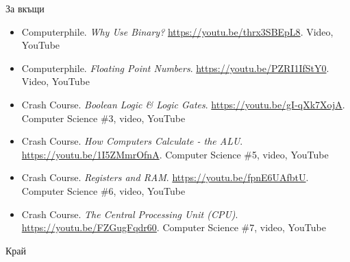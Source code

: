 \documentclass[14pt, aspectratio=169]{beamer}
\begin{document}
\begin{frame}{За вкъщи}
  \footnotesize
  \begin{itemize}[<1->]
    \item \textcolor{tuesnavy}{Computerphile}. \emph{Why Use Binary?}
      {\color{bibnote}\url{https://youtu.be/thrx3SBEpL8}. Video, YouTube}
    \item \textcolor{tuesnavy}{Computerphile}. \emph{Floating Point Numbers}.
      {\color{bibnote}\url{https://youtu.be/PZRI1IfStY0}. Video, YouTube}
    \item \textcolor{tuesnavy}{Crash Course}. \emph{Boolean Logic \& Logic Gates}.
      {\color{bibnote}\url{https://youtu.be/gI-qXk7XojA}. Computer Science
        \#3, video, YouTube}
    \item \textcolor{tuesnavy}{Crash Course}. \emph{How Computers Calculate -
      the ALU}. {\color{bibnote}\url{https://youtu.be/1I5ZMmrOfnA}. Computer
        Science \#5, video, YouTube}
    \item \textcolor{tuesnavy}{Crash Course}. \emph{Registers and RAM}.
      {\color{bibnote}\url{https://youtu.be/fpnE6UAfbtU}. Computer Science
        \#6, video, YouTube}
    \item \textcolor{tuesnavy}{Crash Course}. \emph{The Central Processing Unit
      (CPU)}. {\color{bibnote}\url{https://youtu.be/FZGugFqdr60}. Computer
        Science \#7, video, YouTube}
  \end{itemize}
\end{frame}

\begin{frame}
  \Large Край
\end{frame}
\end{document}
